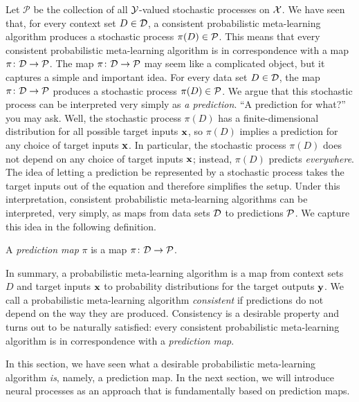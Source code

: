 \documentclass[12pt, twoside]{report}
\begin{document}
Let $\mathcal{P}$ be the collection of all $\mathcal{Y}$-valued stochastic processes on $\mathcal{X}$.
We have seen that, for every context set $D \in \mathcal{D}$, a consistent probabilistic meta-learning algorithm produces a stochastic process $\pi(D) \in \mathcal{P}$.
This means that every consistent probabilistic meta-learning algorithm is in correspondence with a map $\pi\colon \mathcal{D} \to \mathcal{P}$.
The map $\pi\colon \mathcal{D} \to \mathcal{P}$ may seem like a complicated object, but it captures a simple and important idea.
For every data set $D \in \mathcal{D}$, the map $\pi\colon \mathcal{D} \to \mathcal{P}$ produces a stochastic process $\pi(D) \in \mathcal{P}$.
We argue that this stochastic process can be interpreted very simply as \emph{a prediction}.
``A prediction for what?'' you may ask.
Well, the stochastic process $\pi(D)$ has a finite-dimensional distribution for all possible target inputs $\mathbf{x}$, so $\pi(D)$ implies a prediction for any choice of target inputs $\mathbf{x}$. 
In particular, the stochastic process $\pi(D)$ does not depend on any choice of target inputs $\mathbf{x}$;
instead, $\pi(D)$ predicts \emph{everywhere}.
The idea of letting a prediction be represented by a stochastic process takes the target inputs out of the equation and therefore simplifies the setup.
Under this interpretation, consistent probabilistic meta-learning algorithms can be interpreted, very simply, as maps from data sets $\mathcal{D}$ to predictions $\mathcal{P}$.
We capture this idea in the following definition.

\begin{definition}
    \label{def:prediction_map}
    A \emph{prediction map} $\pi$ is a map $\pi\colon \mathcal{D} \to \mathcal{P}$.
\end{definition}

In summary, a probabilistic meta-learning algorithm is a map from context sets $D$ and target inputs $\mathbf{x}$ to probability distributions for the target outputs $\mathbf{y}$.
We call a probabilistic meta-learning algorithm \emph{consistent} if predictions do not depend on the way they are produced.
Consistency is a desirable property
and turns out to be naturally satisfied:
every consistent probabilistic meta-learning algorithm is in correspondence with a \emph{prediction map}.

In this section, we have seen what a desirable probabilistic meta-learning algorithm \emph{is}, namely, a prediction map. 
In the next section, we will introduce neural processes as an approach that is fundamentally based on prediction maps.
\end{document}
